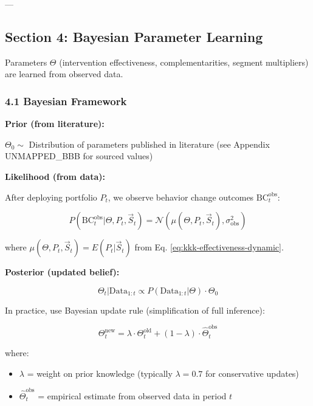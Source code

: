 ---

\subsection*{Section 4: Bayesian Parameter Learning}
\label{sec:kkk-learning}

Parameters $\Theta$ (intervention effectiveness, complementarities, segment multipliers) are learned from observed data.

\subsubsection*{4.1 Bayesian Framework}

\textbf{Prior (from literature):}

$\Theta_0 \sim$ Distribution of parameters published in literature (see Appendix UNMAPPED_BBB for sourced values)

\textbf{Likelihood (from data):}

After deploying portfolio $P_t$, we observe behavior change outcomes $\text{BC}_t^{\text{obs}}$:

\begin{equation}
P(\text{BC}_t^{\text{obs}} | \Theta, P_t, \vec{S}_t) = \mathcal{N}(\mu(\Theta, P_t, \vec{S}_t), \sigma^2_{\text{obs}})
\label{eq:kkk-likelihood}
\end{equation}

where $\mu(\Theta, P_t, \vec{S}_t) = E(P_t | \vec{S}_t)$ from Eq. \ref{eq:kkk-effectiveness-dynamic}.

\textbf{Posterior (updated belief):}

\begin{equation}
\Theta_t | \text{Data}_{1:t} \propto P(\text{Data}_{1:t} | \Theta) \cdot \Theta_0
\label{eq:kkk-posterior}
\end{equation}

In practice, use Bayesian update rule (simplification of full inference):

\begin{equation}
\Theta_t^{\text{new}} = \lambda \cdot \Theta_t^{\text{old}} + (1-\lambda) \cdot \hat{\Theta}_t^{\text{obs}}
\label{eq:kkk-bayesian-update-simple}
\end{equation}

where:
\begin{itemize}[nosep]
\item $\lambda$ = weight on prior knowledge (typically $\lambda = 0.7$ for conservative updates)
\item $\hat{\Theta}_t^{\text{obs}}$ = empirical estimate from observed data in period $t$
\end{itemize}


